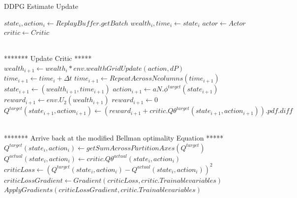 \begin{breakablealgorithm}

\caption{DDPG Estimate Update}\label{alg:ddpg_estimate_update}
\begin{algorithmic}[1]
\State $state_i,action_i \gets ReplayBuffer.getBatch$
\State $wealth_i,time_i  \gets state_i$
\State $actor \gets Actor$
\State $critic \gets Critic$

\State \\******* Update Critic  *****\\

\State $wealth_{i+1} \gets wealth_i * env.wealthGridUpdate(action,dP)$  \label{alg:wul3}
\State $time_{i+1} \gets time_i + \Delta t$
\State $time_{i+1} \gets RepeatAcrossNcolumns(time_{i+1})$ 
\State $state_{i+1} \gets (wealth_{i+1},time_{i+1})$ 
\State $action_{i+1} \gets aN.\phi^{target}(state_{i+1})$ \label{alg:nal3} 
    \State $reward_{i+1} \gets env.U_2(wealth_{i+1})$ \label{alg:nrl31}
\Else
    \State $reward_{i+1} \gets 0 $ \label{alg:nrl3}
\EndIf
\State $Q^{target}(state_{i+1},action_{i+1}) \gets (reward_{i+1} + critic.Q\theta^{target}(state_{i+1},action_{i+1})).pdf.diff$ 


\State \\******* Arrive back at the modified Bellman optimality Equation *****\\
\State $Q^{target}(state_i,action_i) \gets getSumAcrossPartitionAxes(Q^{target})$ 
\State $Q^{actual}(state_i,action_i) \gets critic.Q\theta^{actual}(state_i,action_i)$
\State $criticLoss \gets (Q^{target}(state_i,action_i)- Q^{actual}(state_i,action_i))^2$
\State $criticLossGradient \gets Gradient(criticLoss,critic.Trainablevariables)$
\State $ApplyGradients(criticLossGradient,critic.Trainablevariables)$


\end{algorithmic}
\end{breakablealgorithm}
